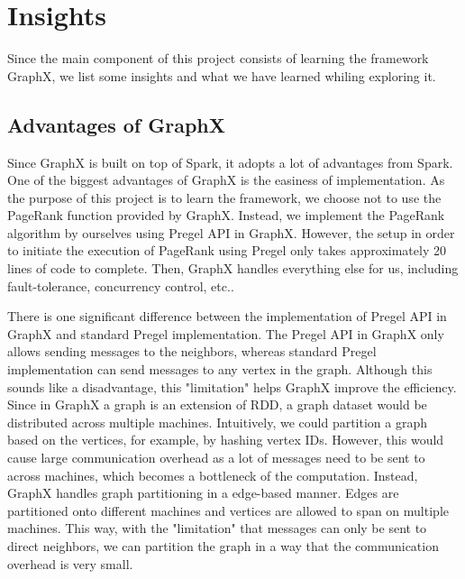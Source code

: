 \section{Insights} \label{sec:insights}
%
Since the main component of this project consists of learning the framework GraphX, we list some insights and what we have learned whiling exploring it.
%
\subsection{Advantages of GraphX}
%
Since GraphX is built on top of Spark, it adopts a lot of advantages from Spark.
%
One of the biggest advantages of GraphX is the easiness of implementation.
%
As the purpose of this project is to learn the framework, we choose not to use the PageRank function provided by GraphX.
%
Instead, we implement the PageRank algorithm by ourselves using Pregel API in GraphX.
%
However, the setup in order to initiate the execution of PageRank using Pregel only takes approximately 20 lines of code to complete.
%
Then, GraphX handles everything else for us, including fault-tolerance, concurrency control, etc..
%

There is one significant difference between the implementation of Pregel API in GraphX and standard Pregel implementation.
%
The Pregel API in GraphX only allows sending messages to the neighbors, whereas standard Pregel implementation can send messages to any vertex in the graph.
%
Although this sounds like a disadvantage, this "limitation" helps GraphX improve the efficiency.
%
Since in GraphX a graph is an extension of RDD, a graph dataset would be distributed across multiple machines.
%
Intuitively, we could partition a graph based on the vertices, for example, by hashing vertex IDs.
%
However, this would cause large communication overhead as a lot of messages need to be sent to across machines, which becomes a bottleneck of the computation.
%
Instead, GraphX handles graph partitioning in a edge-based manner.
%
Edges are partitioned onto different machines and vertices are allowed to span on multiple machines.
%
This way, with the "limitation" that messages can only be sent to direct neighbors, we can partition the graph in a way that the communication overhead is very small.
%

